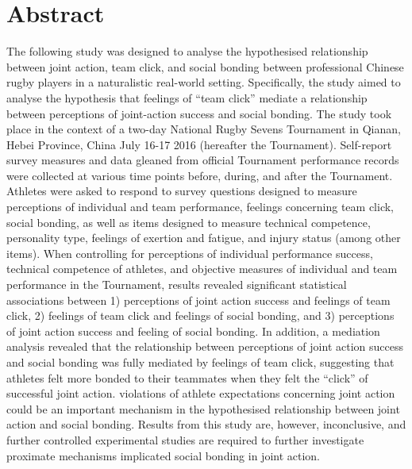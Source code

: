 \section{Abstract}
The following study was designed to analyse the hypothesised relationship between joint action, team click, and social bonding between professional Chinese rugby players in a naturalistic real-world setting.  Specifically, the study aimed to analyse the hypothesis that feelings of ``team click'' mediate a relationship between perceptions of joint-action success and social bonding.  The study took place in the context of a two-day National Rugby Sevens Tournament in Qianan, Hebei Province, China July 16-17 2016 (hereafter the Tournament).  Self-report survey measures and data gleaned from official Tournament performance records were collected at various time points before, during, and after the Tournament.  Athletes were asked to respond to survey questions designed to measure perceptions of individual and team performance, feelings concerning team click, social bonding, as well as items designed to measure technical competence, personality type, feelings of exertion and fatigue, and injury status (among other items). When controlling for perceptions of individual performance success, technical competence of athletes, and objective measures of individual and team performance in the Tournament, results revealed significant statistical associations between 1) perceptions of joint action success and feelings of team click, 2) feelings of team click and feelings of social bonding, and 3) perceptions of joint action success and feeling of social bonding.  In addition, a mediation analysis revealed that the relationship between perceptions of joint action success and social bonding was fully mediated by feelings of team click, suggesting that athletes felt more bonded to their teammates when they felt the ``click'' of successful joint action.  violations of athlete expectations concerning joint action could be an important mechanism in the hypothesised relationship between joint action and social bonding. Results from this study are, however, inconclusive, and further controlled experimental studies are required to further investigate proximate mechanisms implicated social bonding in joint action.

